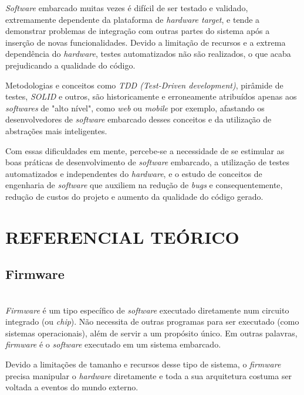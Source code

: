 \documentclass[times, twoside, watermark]{artigo}
\begin{document}
\textit{Software} embarcado muitas vezes é difícil de ser testado e validado, extremamente dependente da plataforma de 
\textit{hardware target}, e tende a demonstrar problemas de integração com outras partes do sistema após a inserção de 
novas funcionalidades. Devido a limitação de recursos e a extrema dependência do \textit{hardware}, testes automatizados 
não são realizados, o que acaba prejudicando a qualidade do código.

Metodologias e conceitos como \textit{TDD (Test-Driven development)}, pirâmide de testes, \textit{SOLID} e outros, 
são historicamente e erroneamente atribuídos apenas aos \textit{softwares} de "alto nível", como \textit{web} ou 
\textit{mobile} por exemplo, afastando os desenvolvedores de \textit{software} embarcado desses conceitos e da utilização de abstrações mais inteligentes. 

Com essas dificuldades em mente, percebe-se a necessidade de se estimular as boas práticas de desenvolvimento de 
\textit{software} embarcado, a utilização de testes automatizados e independentes do \textit{hardware}, 
e o estudo de conceitos de engenharia de \textit{software} que auxiliem na redução de \textit{bugs} e consequentemente, 
redução de custos do projeto e aumento da qualidade do código gerado.




\section*{REFERENCIAL TEÓRICO}

\subsection{Firmware}\hfill\\
\textit{Firmware} é um tipo específico de \textit{software} executado diretamente
num circuito integrado (ou \textit{chip}). 
Não necessita de outras programas para ser executado (como sistemas operacionais),
além de servir a um propósito único. 
Em outras palavras, \textit{firmware} é o \textit{software} executado em um sistema
 embarcado.\cite{ganssle2004firmware}

Devido a limitações de tamanho e recursos desse tipo de sistema, 
o \textit{firmware} precisa manipular o \textit{hardware} diretamente e toda a sua
 arquitetura costuma ser voltada a eventos do mundo externo.
\end{document}
